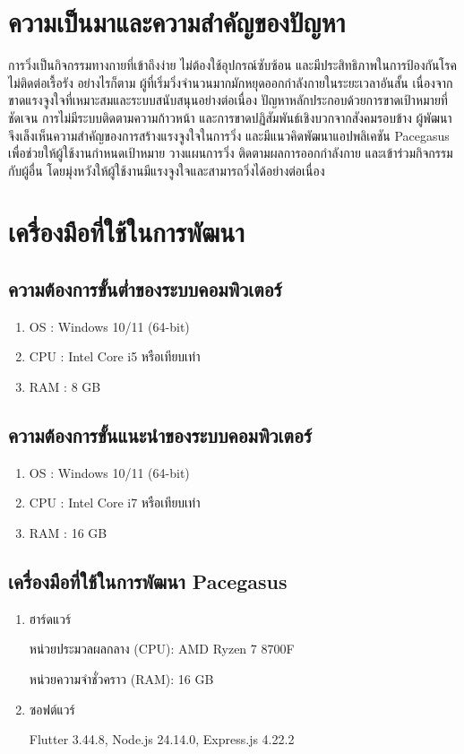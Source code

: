 \section{ความเป็นมาและความสำคัญของปัญหา}
การวิ่งเป็นกิจกรรมทางกายที่เข้าถึงง่าย ไม่ต้องใช้อุปกรณ์ซับซ้อน และมีประสิทธิภาพในการป้องกันโรคไม่ติดต่อเรื้อรัง อย่างไรก็ตาม ผู้ที่เริ่มวิ่งจำนวนมากมักหยุดออกกำลังกายในระยะเวลาอันสั้น เนื่องจากขาดแรงจูงใจที่เหมาะสมและระบบสนับสนุนอย่างต่อเนื่อง ปัญหาหลักประกอบด้วยการขาดเป้าหมายที่ชัดเจน การไม่มีระบบติดตามความก้าวหน้า และการขาดปฏิสัมพันธ์เชิงบวกจากสังคมรอบข้าง
 ผู้พัฒนาจึงเล็งเห็นความสำคัญของการสร้างแรงจูงใจในการวิ่ง และมีแนวคิดพัฒนาแอปพลิเคชัน Pacegasus เพื่อช่วยให้ผู้ใช้งานกำหนดเป้าหมาย วางแผนการวิ่ง ติดตามผลการออกกำลังกาย และเข้าร่วมกิจกรรมกับผู้อื่น โดยมุ่งหวังให้ผู้ใช้งานมีแรงจูงใจและสามารถวิ่งได้อย่างต่อเนื่อง

\section{เครื่องมือที่ใช้ในการพัฒนา}
\subsection{ความต้องการขั้นต่ำของระบบคอมพิวเตอร์}
\begin{enumerate}[label=(\arabic*)]
    \item OS : Windows 10/11 (64-bit)
    \item CPU : Intel Core i5 หรือเทียบเท่า
    \item RAM : 8 GB
\end{enumerate}

\subsection{ความต้องการขั้นแนะนำของระบบคอมพิวเตอร์}
\begin{enumerate}[label=(\arabic*)]
    \item OS : Windows 10/11 (64-bit)
    \item CPU : Intel Core i7 หรือเทียบเท่า
    \item RAM : 16 GB
\end{enumerate}

\subsection{เครื่องมือที่ใช้ในการพัฒนา Pacegasus}
\begin{enumerate}[label=(\arabic*)]
    \item ฮาร์ดแวร์
    \par หน่วยประมวลผลกลาง (CPU): AMD Ryzen 7 8700F
    \par หน่วยความจำชั่วคราว (RAM): 16 GB
    \item ซอฟต์แวร์
    \par Flutter 3.44.8, Node.js 24.14.0, Express.js 4.22.2
\end{enumerate}

